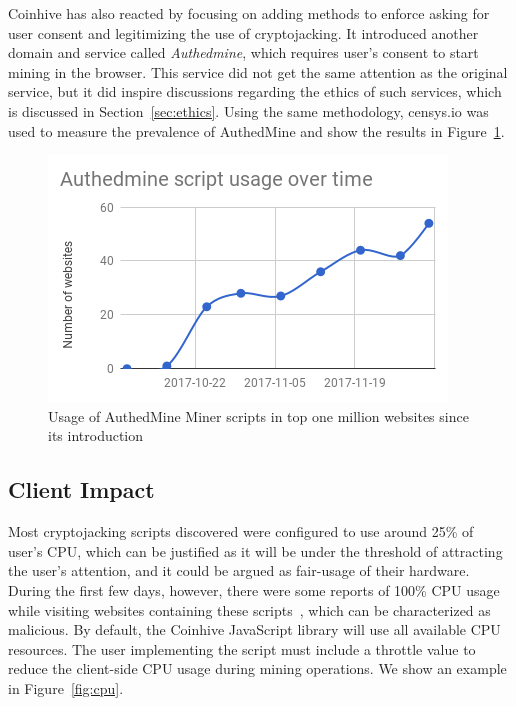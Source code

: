 Coinhive has also reacted by focusing on adding methods to enforce asking for user consent and legitimizing the use of cryptojacking. It introduced another domain and service called \textit{Authedmine}, which requires user's consent to start mining in the browser. This service did not get the same attention as the original service, but it did inspire discussions regarding the ethics of such services, which is discussed in Section~\ref{sec:ethics}. Using the same methodology, censys.io was used to measure the prevalence of AuthedMine and show the results in Figure~\ref{fig:authmine}. 

\begin{figure}[t]
\centering
\includegraphics[width=0.9\linewidth]{figures/usage_of_authedmine_over_time.png}
	\caption[AuthedMine Statistics]{Usage of AuthedMine Miner scripts in top one million websites since its introduction} \label{fig:authmine}
\end{figure}

\subsection{Client Impact}

Most cryptojacking scripts discovered were configured to use around 25\% of user's CPU, which can be justified as it will be under the threshold of attracting the user's attention, and it could be argued as fair-usage of their hardware. During the first few days, however, there were some reports of 100\% CPU usage while visiting websites containing these scripts~\cite{piratesbayblog}, which can be characterized as malicious. By default, the Coinhive JavaScript library will use all available CPU resources. The user implementing the script must include a throttle value to reduce the client-side CPU usage during mining operations. We show an example in Figure~\ref{fig:cpu}.

